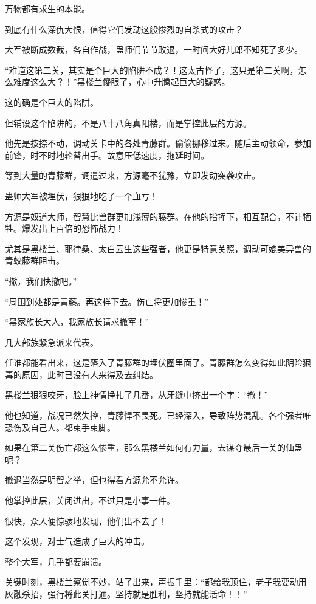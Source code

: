\begin{this_body}
万物都有求生的本能。

到底有什么深仇大恨，值得它们发动这般惨烈的自杀式的攻击？

大军被断成数截，各自作战，蛊师们节节败退，一时间大好儿郎不知死了多少。

“难道这第二关，其实是个巨大的陷阱不成？！这太古怪了，这只是第二关啊，怎么难度这么大？！”黑楼兰傻眼了，心中升腾起巨大的疑惑。

这的确是个巨大的陷阱。

但铺设这个陷阱的，不是八十八角真阳楼，而是掌控此层的方源。

他先是按捺不动，调动关卡中的各处青藤群。偷偷挪移过来。随后主动领命，参加前锋，时不时地轮替出手。故意压低速度，拖延时间。

等到大量的青藤群，调遣过来，方源毫不犹豫，立即发动突袭攻击。

蛊师大军被埋伏，狠狠地吃了一个血亏！

方源是奴道大师，智慧比兽群更加浅薄的藤群。在他的指挥下，相互配合，不计牺牲。爆发出上百倍的恐怖战力！

尤其是黑楼兰、耶律桑、太白云生这些强者，他更是特意关照，调动可媲美异兽的青蛟藤群阻击。

“撤，我们快撤吧。”

“周围到处都是青藤。再这样下去。伤亡将更加惨重！”

“黑家族长大人，我家族长请求撤军！”

几大部族紧急派来代表。

任谁都能看出来，这是落入了青藤群的埋伏圈里面了。青藤群怎么变得如此阴险狠毒的原因，此时已没有人来得及去纠结。

黑楼兰狠狠咬牙，脸上神情挣扎了几番，从牙缝中挤出一个字：“撤！”

他也知道，战况已然失控，青藤悍不畏死。已经深入，导致阵势混乱。各个强者唯恐伤及自己人。都束手束脚。

如果在第二关伤亡都这么惨重，那么黑楼兰如何有力量，去谋夺最后一关的仙蛊呢？

撤退当然是明智之举，但也得看方源允不允许。

他掌控此层，关闭进出，不过只是小事一件。

很快，众人便惊骇地发现，他们出不去了！

这个发现，对士气造成了巨大的冲击。

整个大军，几乎都要崩溃。

关键时刻，黑楼兰察觉不妙，站了出来，声振千里：“都给我顶住，老子我要动用灰融杀招，强行将此关打通。坚持就是胜利，坚持就能活命！！”


\end{this_body}
